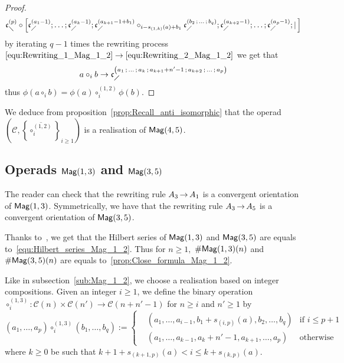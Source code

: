 \begin{proof}
\begin{equation}
\mathfrak{c}^{\left(p\right)}_{\diagdown} \circ \left[\mathfrak{c}^{\left(a_1-1\right)}_{\diagup}; \dots ; \mathfrak{c}^{\left(a_k-1\right)}_{\diagup}; 
\mathfrak{c}^{\left(a_{k+1}-1+b_1\right)}_{\diagup} \circ_{i-s_{(1,k)}(a)+b_1} 
\mathfrak{c}^{\left(b_2 \, ; \, \dots \, ; \, b_q\right)}_{\diagup}  ; \mathfrak{c}^{\left(a_{k+2}-1\right)}_{\diagup} ; \dots; 
\mathfrak{c}^{\left(a_p-1\right)}_{\diagup} ; | \, \right]
\end{equation}
by iterating $q-1$ times the rewriting process 
$\eqref{equ:Rewriting_1_Mag_1_2} \rightarrow 
\eqref{equ:Rewriting_2_Mag_1_2}$ we get that 
\begin{equation}
a \circ_i b \rightarrow \mathfrak{c}^{\left(a_1 \, ; \, \dots \, ; \, a_{k} \, ; \, 
a_{k+1} + n'-1 \, ; \, a_{k+2} \, ; \, \dots \, ; \, a_p\right)}_{\diagup}
\end{equation}
thus $\phi(a \circ_i b) = \phi(a) \circ_i^{(1,2)} \phi(b)$.
\end{proof}

We deduce from proposition~\ref{prop:Recall_anti_isomorphic} that the
 operad $\left(\mathcal{C}, 
 \left\{\overline{\circ_i^{(1,2)}}\right\}_{i \geq 1}\right)$ 
is a realisation of $\mathsf{Mag}(4,5)$.

\subsection{Operads \texorpdfstring{$\mathsf{Mag}(1,3)$}{Mag(1,3)} and 
\texorpdfstring{$\mathsf{Mag}(3,5)$}{Mag(3,5)}}
The reader can check that the rewriting rule $A_3 \operatorname{\to} A_1$ is a 
convergent orientation of $\mathsf{Mag}(1,3)$. Symmetrically, we have that the 
rewriting rule $A_3 \operatorname{\to} A_5$ is a convergent orientation of 
$\mathsf{Mag}(3,5)$.

Thanks to~\cite{Gir18}, we get that the Hilbert series of $\mathsf{Mag}(1,3)$ 
and $\mathsf{Mag}(3,5)$ are equals to~\eqref{equ:Hilbert_series_Mag_1_2}. Thus 
for $n \geq 1,$ $\# \mathsf{Mag}(1,3)(n)$ and $\# \mathsf{Mag}(3,5)(n)$ are equals 
to~\eqref{prop:Close_formula_Mag_1_2}. 

Like in subsection~\ref{sub:Mag_1_2}, we choose a realisation based on 
integer compositions. Given an integer $i \geq 1$, we define the 
binary operation 
$\circ_i^{(1,3)} : \mathcal{C}(n) \times \mathcal{C}(n')\rightarrow 
\mathcal{C}(n + n' -1)$ for 
$n \geq i$ and $n' \geq 1$ by
\begin{equation}
\left(a_1 , \dots, a_p\right) \circ_i^{(1,3)} 
\left(b_1, \dots ,b_{q}\right) := \left\{
 \begin{split}
 & \left(a_1, \dots ,a_{i-1}, b_1 + s_{(i,p)}(a),b_2,\dots,b_{q}\right) 
 & \text{if } i \leq p + 1\\ 
 & \left(a_1, \dots, a_{k-1}, a_{k} + n'-1, a_{k+1},\dots,a_{p}\right)
  & \text{otherwise}
 \end{split}
\right.
\end{equation}
where $k \geq 0$ be such that 
$k+1 + s_{(k+1,p)}(a) < i \leq k + s_{(k,p)}(a)$.

